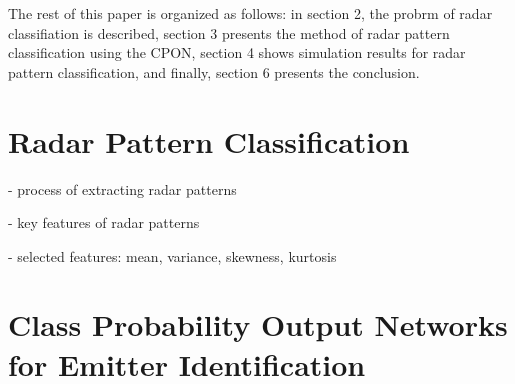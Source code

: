 \documentclass[runningheads,a4paper]{llncs}
\begin{document}
The rest of this paper is organized as follows: in section 2, the probrm of radar classifiation is described, section 3 presents
the method of radar pattern classification using the CPON, section 4 shows simulation results for radar pattern classification, and finally, section 6 presents the conclusion.



\section{Radar Pattern Classification}

- process of extracting radar patterns

- key features of radar patterns

- selected features: mean, variance, skewness, kurtosis



\newpage
\section{Class Probability Output Networks for Emitter Identification}
\end{document}
